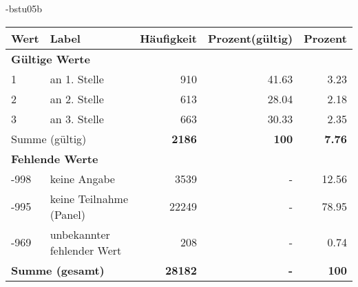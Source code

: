                 \vspace*{-\baselineskip}
					\begin{filecontents}{\jobname-bstu05b}
					\begin{longtable}{lXrrr}
					\toprule
					\textbf{Wert} & \textbf{Label} & \textbf{Häufigkeit} & \textbf{Prozent(gültig)} & \textbf{Prozent} \\
					\endhead
					\midrule
					\multicolumn{5}{l}{\textbf{Gültige Werte}}\\

					1 &
					\multicolumn{1}{X}{ an 1. Stelle   } &


					  \num{910} &
					  \num[round-mode=places,round-precision=2]{41.63} &
					    \num[round-mode=places,round-precision=2]{3.23} \\

					2 &
					\multicolumn{1}{X}{ an 2. Stelle   } &


					  \num{613} &
					  \num[round-mode=places,round-precision=2]{28.04} &
					    \num[round-mode=places,round-precision=2]{2.18} \\

					3 &
					\multicolumn{1}{X}{ an 3. Stelle   } &


					  \num{663} &
					  \num[round-mode=places,round-precision=2]{30.33} &
					    \num[round-mode=places,round-precision=2]{2.35} \\
					\midrule
					\multicolumn{2}{l}{Summe (gültig)} &
					  \textbf{\num{2186}} &
					\textbf{100} &
					  \textbf{\num[round-mode=places,round-precision=2]{7.76}} \\
					\multicolumn{5}{l}{\textbf{Fehlende Werte}}\\
							-998 &
							keine Angabe &
							  \num{3539} &
							 - &
							  \num[round-mode=places,round-precision=2]{12.56} \\
							-995 &
							keine Teilnahme (Panel) &
							  \num{22249} &
							 - &
							  \num[round-mode=places,round-precision=2]{78.95} \\
							-969 &
							unbekannter fehlender Wert &
							  \num{208} &
							 - &
							  \num[round-mode=places,round-precision=2]{0.74} \\
					\midrule
					\multicolumn{2}{l}{\textbf{Summe (gesamt)}} &
				      \textbf{\num{28182}} &
				    \textbf{-} &
				    \textbf{100} \\
					\bottomrule
					\end{longtable}
					\end{filecontents}
